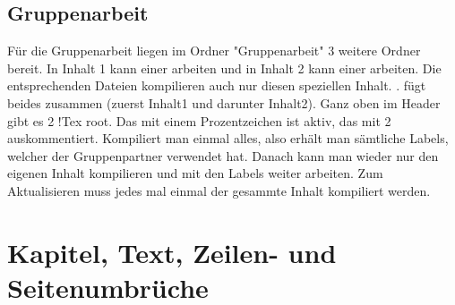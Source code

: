 \documentclass[
12pt,
a4paper,
headings=small,                    %
bibliography=totoc,                %
listof=totoc,                      %
parskip=half*,                     %
]{scrartcl}                        %
\begin{document}
	\subsection{Gruppenarbeit}
	Für die Gruppenarbeit liegen im Ordner "Gruppenarbeit" 3 weitere Ordner bereit. In Inhalt 1 kann einer arbeiten und in Inhalt 2 kann einer arbeiten. Die entsprechenden Dateien kompilieren auch nur diesen speziellen Inhalt. . fügt beides zusammen (zuerst Inhalt1 und darunter Inhalt2).\newline
	Ganz oben im Header gibt es 2 !Tex root. Das mit einem Prozentzeichen ist aktiv, das mit 2 auskommentiert. Kompiliert man einmal alles, also  erhält man sämtliche Labels, welcher der Gruppenpartner verwendet hat. Danach kann man wieder nur den eigenen Inhalt kompilieren und mit den Labels weiter arbeiten. Zum Aktualisieren muss jedes mal einmal der gesammte Inhalt kompiliert werden.
	
	
	\newpage
	\section{Kapitel, Text, Zeilen- und Seitenumbrüche}
\end{document}
